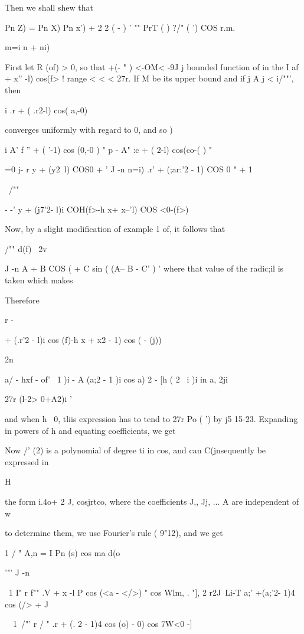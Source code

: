 {{{%
%

Then we shall shew that

Pn Z) = Pn X) Pn x') + 2 2 ( - ) ' "" PrT ( ) ?/" ( ') COS r.m.

m=i n + ni) \

First let R (of) > 0, so that +(- " ) <-OM< -9J j bounded function of
in the I af + x'' -l) cos(f> ! range < < < 27r. If M be its upper
bound and if j A j < i/""', then

i .r + ( .r2-l) cos( a,-0)

converges uniformly with regard to 0, and so )

i A' f '' + ( '-1) cos (0,-0 ) " p - A" :c + ( 2-l) cos(co-( ) "

 =0 j- r y + (y2\ l) COS0 + ' J -n n=i) .r' + (;ar:'2 - 1) COS 0 " + 1

\ /""

- -' y + (j7'2- l)i COH(f>-h x+ x--'l) COS <0-(f>)

Now, by a slight modification of example 1 of, it follows that

/"" d(f) \ 2v

J -n A + B COS ( + C sin ( (A-- B - C' ) ' where that value of the
radic;il is taken which makes

Therefore

r -

+ (.r'2 - l)i cos (f)-h x + x2 - 1) cos ( - (j))

2n

  a/ - hxf - of' \ 1 )i - A (a;2 - 1 )i cos a) 2 - [h ( 2 \ i )i in a,
2ji

27r (l-2> 0+A2)i '

and when h~ 0, tliis expression has to tend to 27r Po ( ') by j5
15-23. Expanding in powers of h and equating coefficients, we get

Now /' (2) is a polynomial of degree ti in cos, and can C(jnsequently
be expressed in

H

the form i.4o+ 2 J, cosjrtco, where the coefficients J,, Jj, ... A
are independent of w 

to determine them, we use Fourier's rule ( 9"12), and we get

1 / " A,n = I Pn (s) cos ma d(o

'"' J -n

\ 1 I" r f"" .V + x -l P cos (<a - </>) " cos Wlm, . "], 2 r2J\ Li-T
a;' +(a;'2- 1)4 cos (/> + J

\ \ 1\ /"' r / " .r + (. 2 - 1)4 cos (o) - 0) cos 7W<0 -]

}}}
